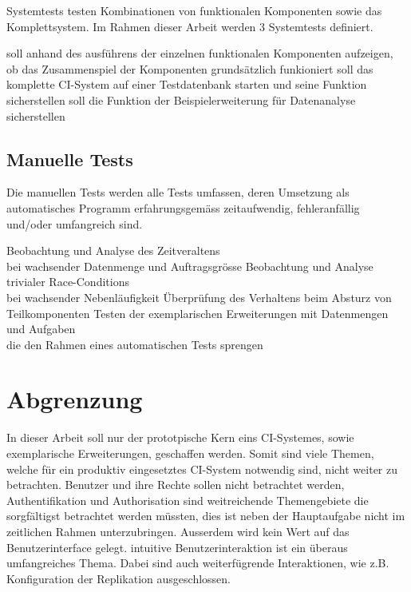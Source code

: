 Systemtests testen Kombinationen von funktionalen Komponenten sowie das Komplettsystem.
Im Rahmen dieser Arbeit werden 3 Systemtests definiert.


\begin{description}
  \dhitem[Komponentendurchlauf]
    soll anhand des ausf\"uhrens der einzelnen funktionalen Komponenten
    aufzeigen, ob das Zusammenspiel der Komponenten
    grunds\"atzlich funkioniert
  \dhitem[Komplettstystem]
    soll das komplette CI-System auf einer Testdatenbank starten
    und seine Funktion sicherstellen
    soll die Funktion der Beispielerweiterung f\"ur Datenanalyse sicherstellen
\end{description}

\subsection{Manuelle Tests}

Die manuellen Tests werden alle Tests umfassen,
deren Umsetzung als automatisches Programm erfahrungsgem\"ass zeitaufwendig,
fehleranf\"allig und/oder umfangreich sind.

\begin{description}
    Beobachtung und Analyse des Zeitveraltens \\
    bei wachsender Datenmenge und Auftragsgr\"osse
    Beobachtung und Analyse trivialer Race-Conditions \\
    bei wachsender Nebenl\"aufigkeit
    \"Uberpr\"ufung des Verhaltens beim Absturz von Teilkomponenten
    Testen der exemplarischen Erweiterungen mit Datenmengen und Aufgaben \\
    die den Rahmen eines automatischen Tests sprengen
\end{description}


\section{Abgrenzung}

In dieser Arbeit soll nur der prototpische Kern eins CI-Systemes,
sowie exemplarische Erweiterungen, geschaffen werden.
Somit sind viele Themen, welche f\"ur ein produktiv eingesetztes CI-System notwendig
sind, nicht weiter zu betrachten.
Benutzer und ihre Rechte sollen nicht betrachtet werden,
Authentifikation und Authorisation sind weitreichende Themengebiete
die sorgf\"altigst betrachtet werden m\"ussten,
dies ist neben der Hauptaufgabe nicht im zeitlichen Rahmen unterzubringen.
Ausserdem wird kein Wert auf das Benutzerinterface gelegt.
intuitive Benutzerinteraktion ist ein \"uberaus umfangreiches Thema.
Dabei sind auch weiterf\"ugrende Interaktionen,
wie z.B. Konfiguration der Replikation ausgeschlossen.



